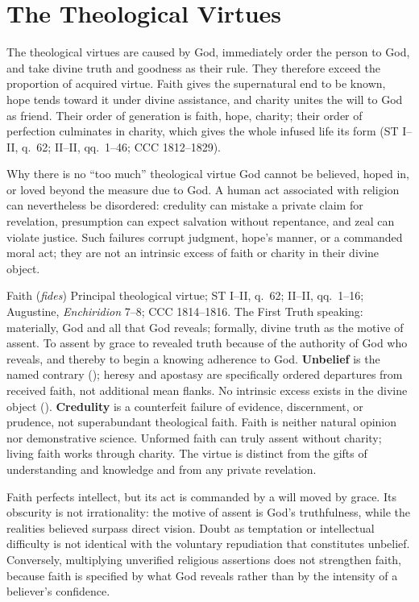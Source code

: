 \section{The Theological Virtues}
\label{sec:theological}

The theological virtues are caused by God, immediately order the person to God, and take divine truth and goodness as their rule. They therefore exceed the proportion of acquired virtue. Faith gives the supernatural end to be known, hope tends toward it under divine assistance, and charity unites the will to God as friend. Their order of generation is faith, hope, charity; their order of perfection culminates in charity, which gives the whole infused life its form (ST I--II, q.~62; II--II, qq.~1--46; CCC 1812--1829).

\begin{studybox}{Why there is no ``too much'' theological virtue}
God cannot be believed, hoped in, or loved beyond the measure due to God. A human act associated with religion can nevertheless be disordered: credulity can mistake a private claim for revelation, presumption can expect salvation without repentance, and zeal can violate justice. Such failures corrupt judgment, hope's manner, or a commanded moral act; they are not an intrinsic excess of faith or charity in their divine object.
\end{studybox}

\virtuedossier
  {Faith (\emph{fides})}
  {Principal theological virtue; ST I--II, q.~62; II--II, qq.~1--16; Augustine, \emph{Enchiridion} 7--8; CCC 1814--1816.}
  {The First Truth speaking: materially, God and all that God reveals; formally, divine truth as the motive of assent.}
  {To assent by grace to revealed truth because of the authority of God who reveals, and thereby to begin a knowing adherence to God.}
  {\textbf{Unbelief} is the named contrary (); heresy and apostasy are specifically ordered departures from received faith, not additional mean flanks.}
  {No intrinsic excess exists in the divine object (). \textbf{Credulity} is a counterfeit failure of evidence, discernment, or prudence, not superabundant theological faith.}
  {Faith is neither natural opinion nor demonstrative science. Unformed faith can truly assent without charity; living faith works through charity. The virtue is distinct from the gifts of understanding and knowledge and from any private revelation.}

Faith perfects intellect, but its act is commanded by a will moved by grace. Its obscurity is not irrationality: the motive of assent is God's truthfulness, while the realities believed surpass direct vision. Doubt as temptation or intellectual difficulty is not identical with the voluntary repudiation that constitutes unbelief. Conversely, multiplying unverified religious assertions does not strengthen faith, because faith is specified by what God reveals rather than by the intensity of a believer's confidence.

